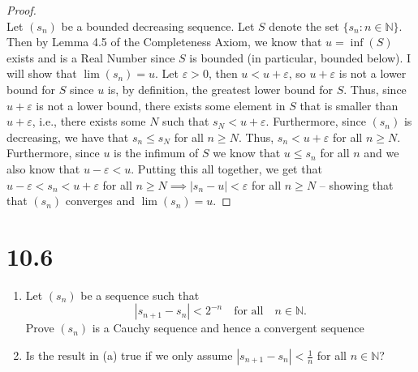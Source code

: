 \documentclass[10pt,a4paper]{article}
\theoremstyle{definition}
\begin{document}
\begin{proof}{$ $}
\\Let $(s_n)$ be a bounded decreasing sequence. Let $S$ denote the set $\{s_n : n \in \mathbb{N}\}$. Then by Lemma 4.5 of the Completeness Axiom, we know that $u = \inf(S)$ exists and is a Real Number since $S$ is bounded (in particular, bounded below). I will show that $\lim(s_n) = u$. Let $\varepsilon > 0$, then $u < u + \varepsilon$, so $u + \varepsilon$ is not a lower bound for $S$ since $u$ is, by definition, the greatest lower bound for $S$. Thus, since $u + \varepsilon$ is not a lower bound, there exists some element in $S$ that is smaller than $u + \varepsilon$, i.e., there exists some $N$ such that $s_N < u + \varepsilon$. Furthermore, since $(s_n)$ is decreasing, we have that $s_n \leq s_N$ for all $n \geq N$. Thus, $s_n < u + \varepsilon$ for all $n \geq N$. Furthermore, since $u$ is the infimum of $S$ we know that $u \leq s_n$ for all $n$ and we also know that $u - \varepsilon < u$. Putting this all together, we get that $u - \varepsilon < s_n < u + \varepsilon$ for all $n \geq N \implies |s_n - u| < \varepsilon$ for all $n \geq N$ -- showing that that $(s_n)$ converges and $\lim(s_n) = u$.
\end{proof}

\section*{10.6}
\begin{enumerate}[label = (\alph*)]
\item Let $(s_n)$ be a sequence such that 
\[|s_{n + 1} - s_n| < 2^{-n} \quad \text{for all} \quad n \in \mathbb{N}.\]
Prove $(s_n)$ is a Cauchy sequence and hence a convergent sequence
\item Is the result in (a) true if we only assume $|s_{n + 1} - s_{n}| < \frac{1}{n}$ for all $n \in \mathbb{N}$?
\end{enumerate}
\end{document}
